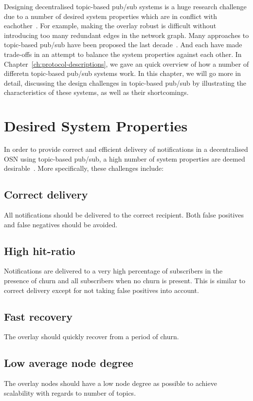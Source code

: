 Designing decentralised topic-based pub/sub systems is a huge research
challenge due to a number of desired system properties which are in
conflict with eachother~\cite{Setty:2012}. For example, making the
overlay robust is difficult without introducing too many redundant edges
in the network graph.  Many approaches to topic-based pub/sub have been
proposed the last
decade~\cites{Baehni:2004}{Castro:2002}{Chockler:2007}{Rahimian:2011}{Girdzijauskas:2010}{Matos:2010}{Wong:2008}{Zhuang:2001}.
And each have made trade-offs in an attempt to balance the system
properties against each other. In
Chapter~\ref{ch:protocol-descriptions}, we gave an quick overview of how
a number of differetn topic-based pub/sub systems work.  In this
chapter, we will go more in detail, discussing the design challenges in
topic-based pub/sub by illustrating the characteristics of these
systems, as well as their shortcomings.


\section{Desired System Properties}

In order to provide correct and efficient delivery of notifications in a
decentralised OSN using topic-based pub/sub, a high number of system
properties are deemed desirable~\cite{Setty:2012}. More specifically,
these challenges include:

\subsection{Correct delivery}
All notifications should be delivered to the
correct recipient. Both false positives and false negatives should be
avoided.

\subsection{High hit-ratio}
Notifications are delivered to a very high
percentage of subscribers in the presence of churn and all subscribers
when no churn is present. This is similar to correct delivery except for
not taking false positives into account.

\subsection{Fast recovery}
The overlay should quickly recover from a
period of churn.

\subsection{Low average node degree}
The overlay nodes should have a low
node degree as possible to achieve scalability with regards to number of
topics.

